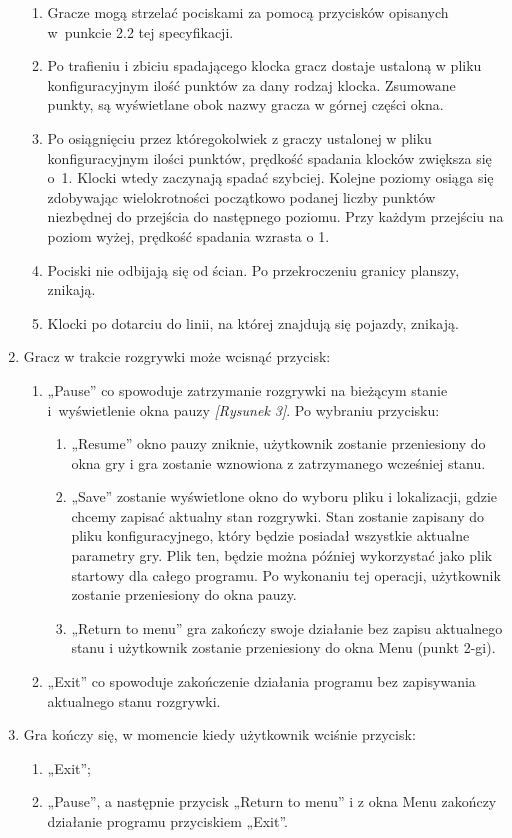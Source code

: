 \documentclass[12pt]{report}
\begin{document}
\begin{enumerate}
\begin{enumerate}
    \item Gracze mogą strzelać pociskami za pomocą przycisków opisanych w~punkcie 2.2 tej specyfikacji. 
    \item Po trafieniu i zbiciu spadającego klocka gracz dostaje ustaloną w pliku konfiguracyjnym ilość punktów za dany rodzaj klocka. Zsumowane punkty, są wyświetlane obok nazwy gracza w górnej części okna. 
    \item Po osiągnięciu przez któregokolwiek z graczy ustalonej w pliku konfiguracyjnym ilości punktów, prędkość spadania klocków zwiększa się o~1. Klocki wtedy zaczynają spadać szybciej. Kolejne poziomy osiąga się zdobywając wielokrotności początkowo podanej liczby punktów niezbędnej do przejścia do następnego poziomu. Przy każdym przejściu na poziom wyżej, prędkość spadania wzrasta o 1. 
    \item Pociski nie odbijają się od ścian. Po przekroczeniu granicy planszy, znikają. 
    \item Klocki po dotarciu do linii, na której znajdują się pojazdy, znikają. 
\end{enumerate}
\item Gracz w trakcie rozgrywki może wcisnąć przycisk: 
\begin{enumerate}
    \item „Pause” co spowoduje zatrzymanie rozgrywki na bieżącym stanie i~wyświetlenie okna pauzy \textit{[Rysunek 3]}. Po wybraniu przycisku: 
    \begin{enumerate}
        \item „Resume” okno pauzy zniknie, użytkownik zostanie przeniesiony do okna gry i gra zostanie wznowiona z zatrzymanego wcześniej stanu. 
        \item „Save” zostanie wyświetlone okno do wyboru pliku i lokalizacji, gdzie chcemy zapisać aktualny stan rozgrywki. Stan zostanie zapisany do pliku konfiguracyjnego, który będzie posiadał wszystkie aktualne parametry gry. Plik ten, będzie można później wykorzystać jako plik startowy dla całego programu. Po wykonaniu tej operacji, użytkownik zostanie przeniesiony do okna pauzy. 
        \item „Return to menu” gra zakończy swoje działanie bez zapisu aktualnego stanu i użytkownik zostanie przeniesiony do okna Menu (punkt 2-gi). 
    \end{enumerate}
    \item „Exit” co spowoduje zakończenie działania programu bez zapisywania aktualnego stanu rozgrywki. 
\end{enumerate}
\item Gra kończy się, w momencie kiedy użytkownik wciśnie przycisk: 
\begin{enumerate}
    \item „Exit”; 
    \item „Pause”, a następnie przycisk „Return to menu” i z okna Menu zakończy działanie programu przyciskiem „Exit”. 
\end{enumerate}
\end{enumerate}
\end{document}

